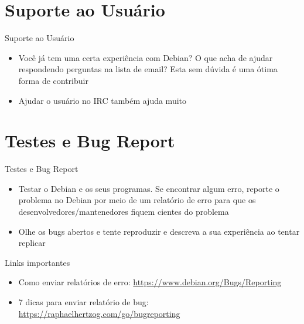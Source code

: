 \documentclass[10pt, compress, aspectratio=169]{beamer}
\begin{document}
\section{Suporte ao Usuário}

\begin{frame}{Suporte ao Usuário}
  \begin{itemize}
    \item Você já tem uma certa experiência com Debian? O que acha de ajudar
          respondendo perguntas na lista de email? Esta sem dúvida é uma ótima
          forma de contribuir
    \item Ajudar o usuário no IRC também ajuda muito
  \end{itemize}
\end{frame}

\section{Testes e Bug Report}

\begin{frame}{Testes e Bug Report}
  \begin{itemize}
    \item Testar o Debian e os seus programas. Se encontrar algum erro, reporte
          o problema no Debian por meio de um relatório de erro para que os
          desenvolvedores/mantenedores fiquem cientes do problema
    \item Olhe os bugs abertos e tente reproduzir e descreva a sua experiência
          ao tentar replicar
  \end{itemize}

  \begin{exampleblock}{Links importantes}
    \begin{itemize}
      \item Como enviar relatórios de erro:  \url{https://www.debian.org/Bugs/Reporting}
      \item 7 dicas para enviar relatório de bug: \url{https://raphaelhertzog.com/go/bugreporting}
    \end{itemize}
  \end{exampleblock}

\end{frame}

\end{document}

